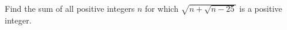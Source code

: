 Find the sum of all positive integers $ n $ for which $\sqrt{n+\sqrt{n-25}}$ is a positive integer.
